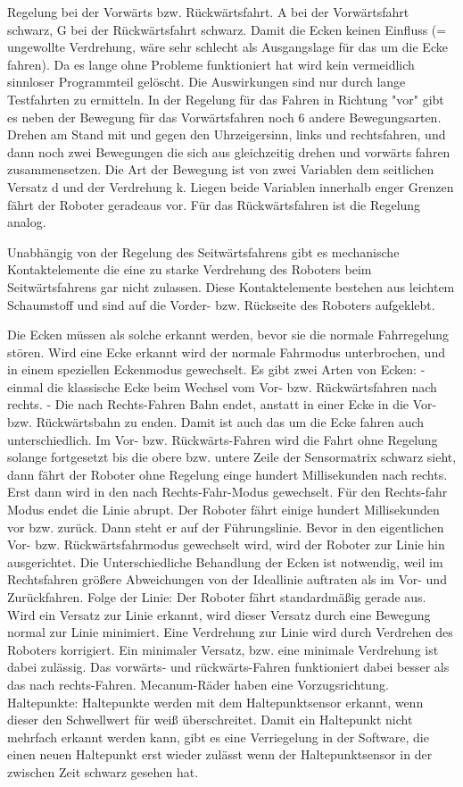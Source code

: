 \documentclass[a4paper,bibtotoc,oneside]{scrbook}
\begin{document}
Regelung bei der Vorwärts bzw. Rückwärtsfahrt. A bei der Vorwärtsfahrt schwarz, G bei der Rückwärtsfahrt schwarz. Damit die Ecken keinen Einfluss (= ungewollte Verdrehung, wäre sehr schlecht als Ausgangslage für das um die Ecke fahren). Da es lange ohne Probleme funktioniert hat wird kein vermeidlich sinnloser Programmteil gelöscht. Die Auswirkungen sind nur durch lange Testfahrten zu ermitteln.
In der Regelung für das Fahren in Richtung "vor" gibt es neben der Bewegung für das Vorwärtsfahren noch 6 andere Bewegungsarten. Drehen am Stand mit und gegen den Uhrzeigersinn, links und rechtsfahren, und dann noch zwei Bewegungen die sich aus gleichzeitig drehen und vorwärts fahren zusammensetzen. Die Art der Bewegung ist von zwei Variablen dem seitlichen Versatz d und der Verdrehung k. Liegen beide Variablen innerhalb enger Grenzen fährt der Roboter geradeaus vor.
Für das Rückwärtsfahren ist die Regelung analog.

Unabhängig von der Regelung des Seitwärtsfahrens gibt es mechanische Kontaktelemente die eine zu starke Verdrehung des Roboters beim Seitwärtsfahrens gar nicht zulassen. Diese Kontaktelemente bestehen aus leichtem Schaumstoff und sind auf die Vorder- bzw. Rückseite des Roboters aufgeklebt.

Die Ecken müssen als solche erkannt werden, bevor sie die normale Fahrregelung stören.
Wird eine Ecke erkannt wird der normale Fahrmodus unterbrochen, und in einem speziellen Eckenmodus gewechselt.
Es gibt zwei Arten von Ecken: 
- einmal die klassische Ecke beim Wechsel vom Vor- bzw. Rückwärtsfahren nach rechts.
- Die nach Rechts-Fahren Bahn endet, anstatt in einer Ecke in die Vor- bzw. Rückwärtsbahn zu enden.
Damit ist auch das um die Ecke fahren auch unterschiedlich.
Im Vor- bzw. Rückwärts-Fahren wird die Fahrt ohne Regelung solange fortgesetzt bis die obere bzw. untere Zeile der Sensormatrix schwarz sieht, dann fährt der Roboter ohne Regelung einge hundert Millisekunden nach rechts. Erst dann wird in den nach Rechts-Fahr-Modus gewechselt.
Für den Rechts-fahr Modus endet die Linie abrupt. Der Roboter fährt einige hundert Millisekunden vor bzw. zurück. Dann steht er auf der Führungslinie. Bevor in den eigentlichen Vor- bzw. Rückwärtsfahrmodus gewechselt wird, wird der Roboter zur Linie hin ausgerichtet. Die Unterschiedliche Behandlung der Ecken ist notwendig, weil im Rechtsfahren größere Abweichungen von der Ideallinie auftraten als im Vor- und Zurückfahren.
Folge der Linie: Der Roboter fährt standardmäßig gerade aus. Wird ein Versatz zur Linie erkannt, wird dieser Versatz durch eine Bewegung normal zur Linie minimiert. Eine Verdrehung zur Linie wird durch Verdrehen des Roboters korrigiert. Ein minimaler Versatz, bzw. eine minimale Verdrehung ist dabei zulässig. 
Das vorwärts- und rückwärts-Fahren funktioniert dabei besser als das nach rechts-Fahren. Mecanum-Räder haben eine Vorzugsrichtung.
Haltepunkte: Haltepunkte werden mit dem Haltepunktsensor erkannt, wenn dieser den Schwellwert für weiß überschreitet. Damit ein Haltepunkt nicht mehrfach erkannt werden kann, gibt es eine Verriegelung in der Software, die einen neuen Haltepunkt erst wieder zulässt wenn der Haltepunktsensor in der zwischen Zeit schwarz gesehen hat.
\end{document}
